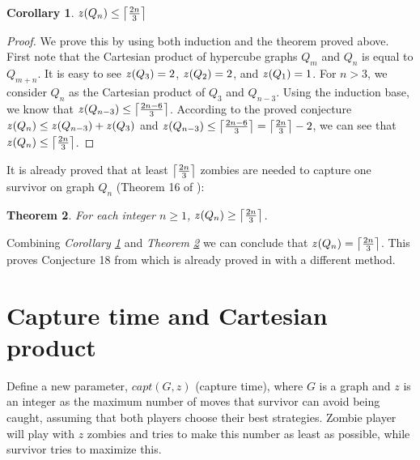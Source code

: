 \documentclass[1p]{elsarticle}
\DeclarePairedDelimiter\ceil{\lceil}{\rceil} \DeclarePairedDelimiter\floor{\lfloor}{\rfloor}
\newtheorem{theorem}{Theorem}
\newtheorem{corollary}[theorem]{Corollary}
\newcommand{\zn}{\ooalign{$z$\cr\hfil\rule[.5ex]{.2em}{.08ex}\hfil\cr}}
\begin{document}
\begin{corollary}
	\label{C3}
	$\zn(Q_{n}) \leq \ceil*{\frac{2n}{3}}$
\end{corollary}
\begin{proof}
	We prove this by using both induction and the theorem proved above. First note that the Cartesian product of
	hypercube graphs $Q_{m}$ and $Q_{n}$ is equal to $Q_{m+n}$. It is easy to see $\zn(Q_3) = 2$, $\zn(Q_2) = 2$, and
	$\zn(Q_1) = 1$. For $n > 3$, we consider $Q_n$ as the Cartesian product of $Q_3$ and $Q_{n-3}$. Using the induction
	base, we know that $\zn(Q_{n-3}) \leq \ceil*{\frac{2n - 6}{3}}$. According to the proved conjecture $\zn(Q_n) \leq
	\zn(Q_{n-3}) + \zn(Q_3)$ and $\zn(Q_{n-3}) \leq \ceil*{\frac{2n - 6}{3}} = \ceil*{\frac{2n}{3}} - 2$, we can see that
	$\zn(Q_n) \leq \ceil*{\frac{2n}{3}}$.
\end{proof}

It is already proved that at least $\ceil*{\frac{2n}{3}}$ zombies are needed to capture one survivor on graph $Q_n$
(Theorem 16 of \cite{Fitz16}):

\begin{theorem}
	\label{T4}
	For each integer $n \geq 1$, $\zn(Q_n) \geq \ceil*{\frac{2n}{3}} $.
\end{theorem}

Combining {\it Corollary \ref{C3}} and {\it Theorem \ref{T4}} we can conclude that $\zn(Q_n) = \ceil*{\frac{2n}{3}}$.
This proves Conjecture 18 from \cite{Fitz16} which is already proved in \cite{Offner19} with a different method. 
	

\section{Capture time and Cartesian product}\label{capturetime}
	Define a new parameter, $capt(G,z)$ (capture time), where $G$ is a graph and $z$ is an integer as the maximum number
	of moves that survivor can avoid being caught, assuming that both players choose their best strategies. Zombie
	player will play with $z$ zombies and tries to make this number as least as possible, while survivor tries to
	maximize this.
\end{document}
